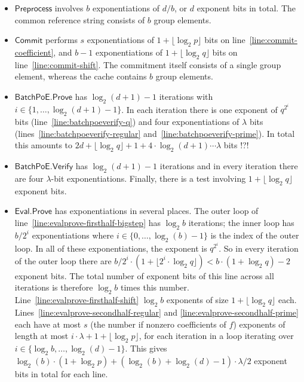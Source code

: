\documentclass[11pt]{article}
\theoremstyle{Definition}
\begin{document}
\begin{itemize}
\item $\mathsf{Preprocess}$ involves $b$ exponentiations of $d/b$, or $d$ exponent bits in total. The common reference string consists of $b$ group elements.
\item $\mathsf{Commit}$ performs $s$ exponentiations of $1+\lfloor \log_2 p \rfloor$ bits on line~\ref{line:commit-coefficient}, and $b-1$ exponentiations of $1+\lfloor \log_2 q \rfloor$ bits on line~\ref{line:commit-shift}. The commitment itself consists of a single group element, whereas the cache contains $b$ group elements.
\item $\mathsf{BatchPoE.Prove}$ has $\log_2(d+1)-1$ iterations with $i \in \{1, \ldots, \log_2(d+1)-1\}$. In each iteration there is one exponent of $q^{2^i}$ bits (line~\ref{line:batchpoeverify-q}) and four exponentiations of $\lambda$ bits (lines~\ref{line:batchpoeverify-regular} and~\ref{line:batchpoeverify-prime}). In total this amounts to $2d + \lfloor \log_2 q \rfloor + 1 + 4\cdot\log_2(d+1)\cdots\lambda$ bits !?!
\item $\mathsf{BatchPoE.Verify}$ has $\log_2(d+1)-1$ iterations and in every iteration there are four $\lambda$-bit exponentiations. Finally, there is a test involving $1+\lfloor \log_2 q \rfloor$ exponent bits.
\item $\mathsf{Eval.Prove}$ has exponentiations in several places. The outer loop of line~\ref{line:evalprove-firsthalf-bigstep} has $\log_2 b$ iterations; the inner loop has $b/2^i$ exponentiations where $i \in \{0, \ldots, \log_2(b)-1\}$ is the index of the outer loop. In all of these exponentiations, the exponent is $q^{2^i}$. So in every iteration of the outer loop there are $b/2^i \cdot (1 + \lfloor 2^i \cdot \log_2 q\rfloor) < b \cdot ( 1 + \log_2 q ) - 2$ exponent bits. The total number of exponent bits of this line across all iterations is therefore $\log_2 b$ times this number. \\
Line~\ref{line:evalprove-firsthalf-shift} $\log_2 b$ exponents of size $1 + \lfloor \log_2 q \rfloor$ each. \\
Lines~\ref{line:evalprove-secondhalf-regular} and \ref{line:evalprove-secondhalf-prime} each have at most $s$ (the number if nonzero coefficients of $f$) exponents of length at most $i \cdot \lambda + 1 + \lfloor \log_2 p \rfloor$, for each iteration in a loop iterating over $i \in \{\log_2 b, \ldots, \log_2(d)-1\}$. This gives $\log_2(b) \cdot ( 1 + \log_2 p ) + (\log_2(b) + \log_2(d)-1) \cdot \lambda / 2$ exponent bits in total for each line. \\

\end{itemize}
\end{document}
